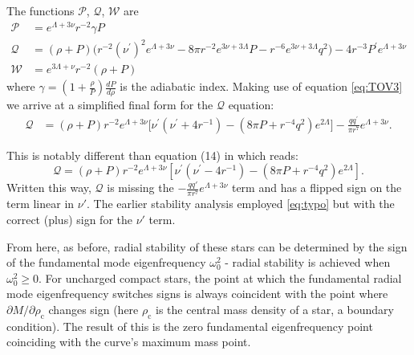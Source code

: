 \documentclass[12pt,noshowpacs,nofootinbib,notitlepage,amsmath,superscriptaddress]{revtex4-1}%
\newcommand{\mg}[1]{{\color{blue}\bf [Michael: #1]}}
\begin{document}
The functions $\mathcal{P}$, $\mathcal{Q}$, $\mathcal{W}$ are 
\cite{Brillante:2014lwa} 
\begin{equation}
\begin{aligned}
\mathcal{P} & =e^{\Lambda+3 \nu} r^{-2} \gamma P \\
\mathcal{Q} & =\left(\rho+P\right)\Big( r^{-2} \left(\nu^\prime\right)^2 e^{\Lambda+3 \nu}-8 \pi r^{-2} e^{3 \nu+3 \Lambda} P -r^{-6} e^{3 \nu+3 \Lambda} q^2\Big) -4 r^{-3} P^\prime e^{\Lambda+3 \nu} \\
\mathcal{W} & =e^{3 \Lambda+\nu} r^{-2}\left(\rho+P\right)
\end{aligned}
\end{equation}
where $\gamma=(1+\frac{\rho}{P})\frac{dP}{d\rho}$ is the adiabatic index.  
Making use of equation  \eqref{eq:TOV3} 
we arrive at a simplified final form for the $\mathcal{Q}$ equation: 
\begin{align}\label{Qcorr}
    \mathcal{Q} &= (\rho + P)r^{-2}e^{\Lambda + 3\nu}\Bigg[\nu^\prime\left(\nu^\prime + 4r^{-1}\right)- (8\pi P  + r^{-4}q^2)e^{2\Lambda}\Bigg] - \frac{q q^\prime}{\pi r^7} e^{\Lambda+3\nu}.
\end{align}

This is notably different than equation (14) in \cite{Goncalves:2020joq} which reads:
\begin{equation}\label{eq:typo}
    \mathcal{Q}=(\rho+P) r^{-2} e^{\Lambda+3 \nu}\left[\nu^\prime\left(\nu^\prime-4 r^{-1}\right)-\left(8 \pi P+r^{-4} q^2\right) e^{2 \Lambda}\right].
\end{equation}
Written this way, $\mathcal{Q}$ is missing the $-\frac{q q'}{ \pi r^7}e^{\Lambda+3\nu}$ term and has a flipped sign on the term linear in $\nu'$. The  earlier stability analysis \cite{zhang:2021}
employed \eqref{eq:typo}
but with the correct (plus) sign for the $\nu'$ term. 

From here, as before, radial stability of these stars can be determined by the sign of the fundamental mode eigenfrequency $\omega_0^2$ - radial stability is achieved when  $\omega_0^2\geq 0$. For uncharged compact stars, the point at which the fundamental radial mode eigenfrequency switches signs is always coincident with the point where $\partial M/\partial \rho_\mathrm{c}$ changes sign (here $\rho_\mathrm{c}$ is the central mass density of a star, a boundary condition). The result of this is the zero fundamental eigenfrequency point coinciding with the curve's maximum mass point.
\end{document}
